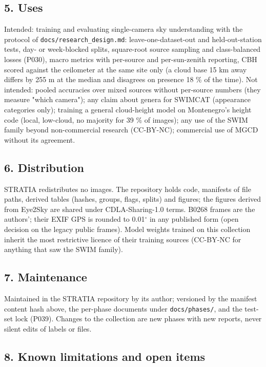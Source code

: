 \subsection{5. Uses}

Intended: training and evaluating single-camera sky understanding with the protocol of \texttt{docs/research\_\allowbreak{}design.md}: leave-one-dataset-out and held-out-station tests, day- or week-blocked splits, square-root source sampling and class-balanced losses (P030), macro metrics with per-source and per-sun-zenith reporting, CBH scored against the ceilometer at the same site only (a cloud base 15 km away differs by 255 m at the median and disagrees on presence 18 \% of the time). Not intended: pooled accuracies over mixed sources without per-source numbers (they measure "which camera"); any claim about genera for SWIMCAT (appearance categories only); training a general cloud-height model on Montenegro's height code (local, low-cloud, no majority for 39 \% of images); any use of the SWIM family beyond non-commercial research (CC-BY-NC); commercial use of MGCD without its agreement.

\subsection{6. Distribution}

STRATIA redistributes no images. The repository holds code, manifests of file paths, derived tables (hashes, groups, flags, splits) and figures; the figures derived from Eye2Sky are shared under CDLA-Sharing-1.0 terms. B0268 frames are the authors'; their EXIF GPS is rounded to 0.01$^\circ$ in any published form (open decision on the legacy public frames). Model weights trained on this collection inherit the most restrictive licence of their training sources (CC-BY-NC for anything that saw the SWIM family).

\subsection{7. Maintenance}

Maintained in the STRATIA repository by its author; versioned by the manifest content hash above, the per-phase documents under \texttt{docs/phases/}, and the test-set lock (P039). Changes to the collection are new phases with new reports, never silent edits of labels or files.

\subsection{8. Known limitations and open items}

